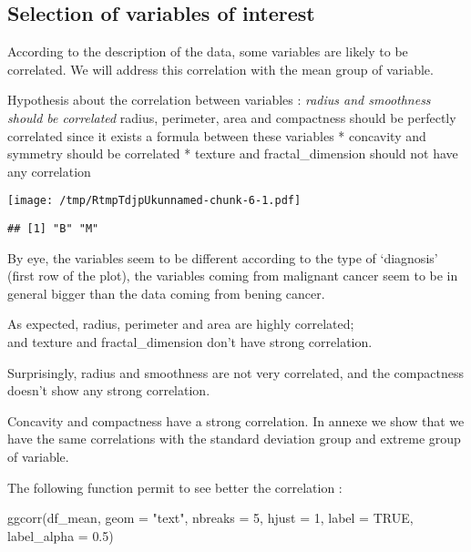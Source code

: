 \documentclass[
  11pt,
]{article}
\newenvironment{Shaded}{\begin{snugshade}}{\end{snugshade}}
\newcommand{\AttributeTok}[1]{\textcolor[rgb]{0.77,0.63,0.00}{#1}}
\newcommand{\ConstantTok}[1]{\textcolor[rgb]{0.00,0.00,0.00}{#1}}
\newcommand{\DecValTok}[1]{\textcolor[rgb]{0.00,0.00,0.81}{#1}}
\newcommand{\FloatTok}[1]{\textcolor[rgb]{0.00,0.00,0.81}{#1}}
\newcommand{\FunctionTok}[1]{\textcolor[rgb]{0.00,0.00,0.00}{#1}}
\newcommand{\NormalTok}[1]{#1}
\newcommand{\StringTok}[1]{\textcolor[rgb]{0.31,0.60,0.02}{#1}}
\begin{document}
\hypertarget{selection-of-variables-of-interest}{%
\subsection{Selection of variables of
interest}\label{selection-of-variables-of-interest}}

According to the description of the data, some variables are likely to
be correlated. We will address this correlation with the mean group of
variable.

Hypothesis about the correlation between variables : \emph{radius and
smoothness should be correlated }radius, perimeter, area and compactness
should be perfectly correlated since it exists a formula between these
variables * concavity and symmetry should be correlated * texture and
fractal\_dimension should not have any correlation

\texttt{[image: /tmp/RtmpTdjpUkunnamed-chunk-6-1.pdf]}

\begin{verbatim}
## [1] "B" "M"
\end{verbatim}

By eye, the variables seem to be different according to the type of
`diagnosis' (first row of the plot), the variables coming from malignant
cancer seem to be in general bigger than the data coming from bening
cancer.

As expected, radius, perimeter and area are highly correlated;\\
and texture and fractal\_dimension don't have strong correlation.

Surprisingly, radius and smoothness are not very correlated, and the
compactness doesn't show any strong correlation.

Concavity and compactness have a strong correlation. In annexe we show
that we have the same correlations with the standard deviation group and
extreme group of variable.

The following function permit to see better the correlation :

\begin{Shaded}
\begin{Highlighting}[]
\FunctionTok{ggcorr}\NormalTok{(df\_mean, }\AttributeTok{geom =} \StringTok{"text"}\NormalTok{, }\AttributeTok{nbreaks =} \DecValTok{5}\NormalTok{, }\AttributeTok{hjust =} \DecValTok{1}\NormalTok{, }\AttributeTok{label =} \ConstantTok{TRUE}\NormalTok{, }\AttributeTok{label\_alpha =} \FloatTok{0.5}\NormalTok{)}
\end{Highlighting}
\end{Shaded}
\end{document}
